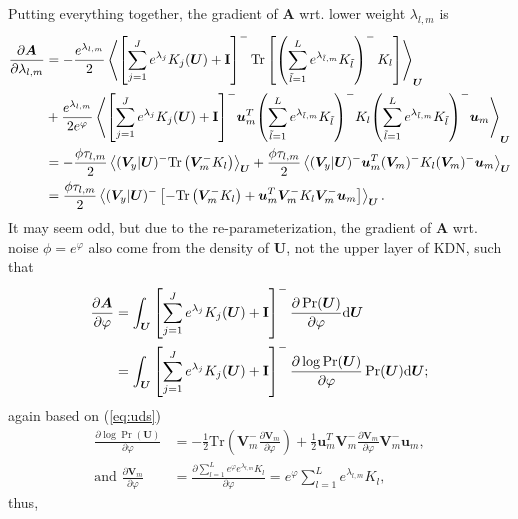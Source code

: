 \documentclass[11pt]{article}
\newcommand{\mean}[2]{\left\langle{#1}\right\rangle_{#2}}
\newcommand{\trb}[1]{\textrm{Tr}\left({#1}\right)}
\newcommand{\invb}[1]{{\left({#1}\right)^-}}
\newcommand{\invs}[1]{{\left[{#1}\right]^-}}
\newcommand{\vu}{\boldsymbol{u}}
\newcommand{\xv}{\boldsymbol{V}}
\newcommand{\xu}{\boldsymbol{U}}
\newcommand{\xa}{\boldsymbol{A}}
\newcommand{\id}{\textrm{\textbf{I}}}
\newcommand{\PDV}[2]{\frac{\partial #1}{\partial #2}}
\begin{document}
Putting everything together, the gradient of $\xa$ wrt. lower weight $\lambda_{l,m}$ is
\begin{equation} \label{eq:lwr_dvt}
  \begin{split}
    \PDV{\xa}{\lambda_{l,m}}
    &= -\frac{e^{\lambda_{l,m}}}{2} \mean{
      \left[ \sum_{j=1}^J{e^{\lambda_j} K_j(\xu)} + \id \right]^-
      \textrm{Tr}\left[ \left(\sum_{\tilde{l}=1}^L e^{\lambda_{\tilde{l},m}} K_{\tilde{l}}\right)^- K_l \right]
    }{\xu} \\
    &+ \frac{e^{\lambda_{l,m}}}{2 e^{\varphi}} \mean{
      \invs{\sum_{j=1}^J{e^{\lambda_j} K_j(\xu)} + \id}
      \vu_m^T \invb{\sum_{\tilde{l}=1}^L e^{\lambda_{\tilde{l},m}} K_{\tilde{l}}}
      K_l
      \invb{\sum_{\tilde{l}=1}^L e^{\lambda_{\tilde{l},m}} K_{\tilde{l}}} \vu_m
    }{\xu} \\
    &= -\frac{\phi\tau_{l,m}}{2} \mean{(\xv_y|\xu)^- \trb{\xv_m^- K_l}}{\xu}
    +\frac{\phi\tau_{l,m}}{2} \mean{(\xv_y|\xu)^- \vu_m^T (\xv_m)^- K_l (\xv_m)^- \vu_m}{\xu} \\
    &= \frac{\phi\tau_{l,m}}{2} \mean{(\xv_y|\xu)^- \left[-\trb{\xv_m^- K_l} + \vu_m^T \xv_m^- K_l \xv_m^- \vu_m \right] }{\xu}.
  \end{split}
\end{equation}
It may seem odd, but due to the re-parameterization, the gradient of $\xa$ wrt. noise $\phi=e^{\varphi}$ also come from the density of $\xu$, not the upper layer of KDN, such that
\begin{align*}
  \PDV{\xa}{\varphi} &= \int_{\xu} \left[ \sum_{j=1}^J{e^{\lambda_j} K_j(\xu)} + \id \right]^- \PDV{\Pr(\xu)}{\varphi} \textrm{d}\xu \\
                     &= \int_{\xu} \left[ \sum_{j=1}^J{e^{\lambda_j} K_j(\xu)} + \id \right]^- \PDV{\log\Pr(\xu)}{\varphi} \Pr(\xu)\textrm{d}\xu;
\end{align*}
again based on (\ref{eq:uds})
\begin{align*}
  \PDV{\log\Pr(\xu)}{\varphi} &= -\frac{1}{2}\trb{\xv_m^-\PDV{\xv_m}{\varphi}} + \frac{1}{2}\vu_m^T\xv_m^-\PDV{\xv_m}{\varphi}\xv_m^-\vu_m, \\
  \textrm{and }
  \PDV{\xv_m}{\varphi} &= \PDV{\sum_{l=1}^L e^{\varphi}e^{\lambda_{l,m}}K_l}{\varphi} = e^{\varphi}\sum_{l=1}^L e^{\lambda_{l,m}}K_l,
\end{align*}
thus,
\end{document}
